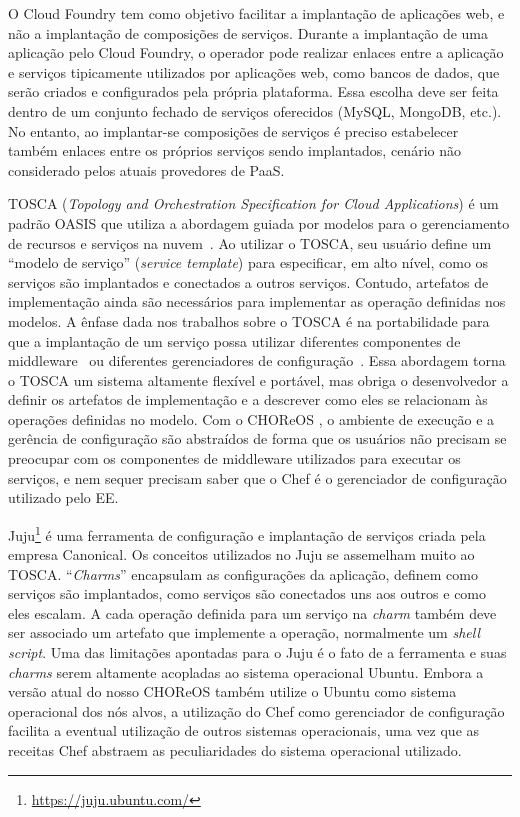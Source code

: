 O Cloud Foundry tem como objetivo facilitar a implantação de aplicações web, e não a implantação de composições de serviços. Durante a implantação de uma aplicação pelo Cloud Foundry, o operador pode realizar enlaces entre a aplicação e serviços tipicamente utilizados por aplicações web, como bancos de dados, que serão criados e configurados pela própria plataforma. Essa escolha deve ser feita dentro de um conjunto fechado de serviços oferecidos (MySQL, MongoDB, etc.). No entanto, ao implantar-se composições de serviços é preciso estabelecer também enlaces entre os próprios serviços sendo implantados, cenário não considerado pelos atuais provedores de PaaS.

TOSCA (\emph{Topology and Orchestration Specification for Cloud Applications})
é um padrão OASIS que utiliza a abordagem guiada por modelos para
o gerenciamento de recursos e serviços na nuvem~\cite{Wettinger2013Tosca}.
Ao utilizar o TOSCA, seu usuário define um ``modelo de serviço'' (\emph{service template})
para especificar, em alto nível, como os serviços são implantados e conectados a outros serviços.
Contudo, artefatos de implementação ainda são necessários
para implementar as operação definidas nos modelos.
A ênfase dada nos trabalhos sobre o TOSCA é na portabilidade
para que a implantação de um serviço possa utilizar diferentes
componentes de middleware~\cite{Wettinger2013ExtensiblePaaS} 
ou diferentes gerenciadores de configuração~\cite{Wettinger2013Tosca}.
Essa abordagem torna o TOSCA um sistema altamente flexível e portável,
mas obriga o desenvolvedor a definir os
artefatos de implementação e a descrever como eles se
relacionam às operações definidas no modelo.
Com o CHOReOS \ee, o ambiente de execução e a gerência de configuração são
abstraídos de forma que os usuários não precisam se preocupar
com os componentes de middleware utilizados para executar os serviços,
e nem sequer precisam saber que o Chef é o gerenciador de configuração
utilizado pelo EE.

Juju\footnote{\url{https://juju.ubuntu.com/}} é uma ferramenta 
de configuração e implantação de serviços criada pela empresa Canonical.
Os conceitos utilizados no Juju se assemelham muito ao TOSCA.
``\emph{Charms}'' encapsulam as configurações da aplicação,
definem como serviços são implantados, como serviços
são conectados uns aos outros e como eles escalam.
A cada operação definida para um serviço na \emph{charm}
também deve ser associado um artefato que implemente a operação,
normalmente um \emph{shell script}.
Uma das limitações apontadas para o Juju é o fato
de a ferramenta e suas \emph{charms} serem altamente acopladas ao
sistema operacional Ubuntu.
Embora a versão atual do nosso CHOReOS \ee também utilize o Ubuntu
como sistema operacional dos nós alvos,
a utilização do Chef como gerenciador de configuração
facilita a eventual utilização de outros sistemas operacionais,
uma vez que as receitas Chef abstraem as peculiaridades
do sistema operacional utilizado.

